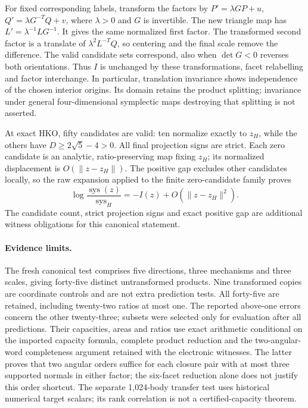 For fixed corresponding labels, transform the factors by
$P'=\lambda GP+u$, $Q'=\lambda G^{-T}Q+v$,
where $\lambda>0$ and $G$ is invertible.
The new triangle map has $L'=\lambda^{-1}LG^{-1}$.
It gives the same normalized first factor. The transformed second factor
is a translate of $\lambda^2L^{-T}Q$, so centering and the final scale
remove the difference. The valid candidate sets correspond, also when
$\det G<0$ reverses both orientations. Thus $I$ is unchanged by these
transformations, facet relabelling and factor interchange. In particular,
translation invariance shows independence of the chosen interior origins. Its domain
retains the product splitting; invariance under general four-dimensional
symplectic maps destroying that splitting is not asserted.

At exact HKO, fifty candidates are valid: ten normalize exactly to $z_H$,
while the others have $D\geq2\sqrt5-4>0$. All final projection signs are
strict. Each zero candidate is an analytic, ratio-preserving map fixing
$z_H$; its normalized displacement is $O(\|z-z_H\|)$.
The positive gap excludes other candidates locally, so the raw expansion
applied to the finite zero-candidate family proves
\[
 \log\frac{\operatorname{sys}(z)}{\operatorname{sys}_H}
             =-I(z)+O(\|z-z_H\|^2).
\]
The candidate count, strict projection signs and exact positive gap are
additional witness obligations for this canonical statement.

\paragraph{Evidence limits.}
The fresh canonical test comprises five directions, three mechanisms and
three scales, giving forty-five distinct untransformed products. Nine
transformed copies are coordinate controls and are not extra prediction
tests. All forty-five are retained, including twenty-two ratios at most
one. The reported above-one errors concern the other twenty-three;
subsets were selected only for evaluation after all predictions.
Their capacities, areas and ratios use exact arithmetic conditional on
the imported capacity formula, complete product reduction and the
two-angular-word completeness argument retained with the electronic
witnesses. The latter proves that two angular orders suffice for each
closure pair with at most three supported normals in either factor;
the six-facet reduction alone does not justify this order shortcut.
The separate 1,024-body transfer test uses historical numerical target
scalars; its rank correlation is not a certified-capacity theorem.

